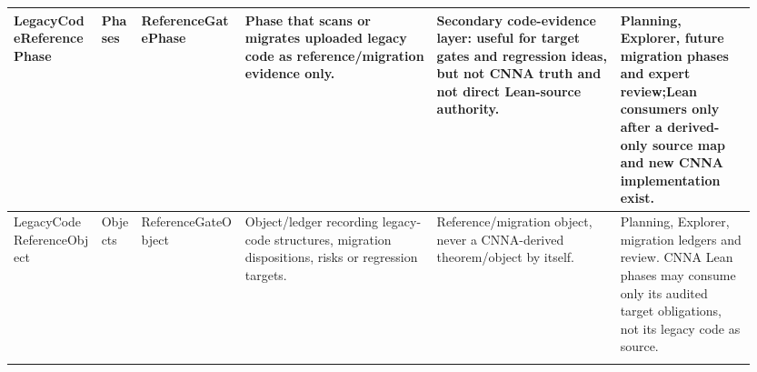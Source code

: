 \begin{longtable}{L{0.115\linewidth} L{0.055\linewidth} L{0.135\linewidth} L{0.245\linewidth} L{0.23\linewidth} L{0.17\linewidth}}
LegacyCodeReferencePhase & Phases & ReferenceGatePhase & Phase that scans or migrates uploaded legacy code as reference/\allowbreak{}migration evidence only. & Secondary code-evidence layer: useful for target gates and regression ideas, but not CNNA truth and not direct Lean-source authority. & Planning, Explorer, future migration phases and expert review;\newline Lean consumers only after a derived-only source map and new CNNA implementation exist.\\
\hline
\addlinespace[0.24em]
LegacyCodeReferenceObject & Objects & ReferenceGateObject & Object/\allowbreak{}ledger recording legacy-code structures, migration dispositions, risks or regression targets. & Reference/\allowbreak{}migration object, never a CNNA-derived theorem/\allowbreak{}object by itself. & Planning, Explorer, migration ledgers and review. CNNA Lean phases may consume only its audited target obligations, not its legacy code as source.\\
\hline
\addlinespace[0.24em]
\end{longtable}
\normalsize
